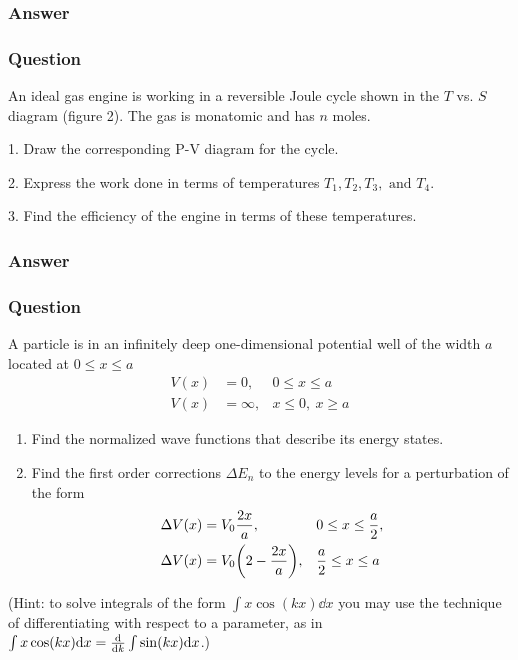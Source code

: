 \subsubsection{Answer}



\subsubsection{Question}
An ideal gas engine is working in a reversible Joule cycle shown in the $T$ vs. $S$ diagram (figure 2). The gas is monatomic and has $n$ moles.

1. Draw the corresponding P-V diagram for the cycle.

2. Express the work done in terms of temperatures $T_1, T_2, T_3,\text{ and }T_4$.

3. Find the efficiency of the engine in terms of these temperatures.
\subsubsection{Answer}



\subsubsection{Question}
A particle is in an infinitely deep one-dimensional potential well of the width $a$ located at $0\le x\le a$
\begin{align*}
	V(x) &= 0, &0\le x\le a\\
	V(x) &= \infty, &x\le 0,\ x\ge a
\end{align*}
\begin{enumerate}
	\item Find the normalized wave functions that describe its energy states. 
	\item Find the first order corrections ${\Delta}E_n$ to the energy levels for a perturbation of the form
	\begin{align*}
		\Delta V(x) &= V_0 \frac{2x}{a}, && 0\le x\le \frac{a}{2},\\
		\Delta V(x) &= V_0\qty(2-\frac{2x}{a}), && \frac{a}{2}\le x\le a
	\end{align*}
\end{enumerate}
(Hint: to solve integrals of the form $\int x \cos(kx)\dd x$ you may use the technique of differentiating with respect to a parameter, as in $\int x \cos(kx)\dd x = \dv{k} \int \sin(kx) \dd x$.)
